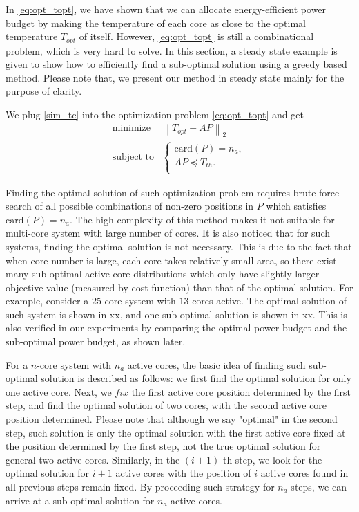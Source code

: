 In \eqref{eq:opt_topt}, we have shown that we can allocate energy-efficient power budget by making the temperature of each core as close to the optimal temperature $T_{opt}$ of itself. However, \eqref{eq:opt_topt} is still a combinational problem, which is very hard to solve. In this section, a steady state example is given to show how to efficiently find a sub-optimal solution using a greedy based method. Please note that, we present our method in steady state mainly for the purpose of clarity.

We plug \eqref{sim_tc} into the optimization problem \eqref{eq:opt_topt} and get
\begin{equation}\label{eq:sim_opt_topt}
\begin{split}
\text{minimize } &  \left \| T_{opt} - AP \right \|_{2}\\
\text{subject to} &\left\{
\begin{array}{lr}
\text{card}(P) = n_{a},\\
AP \preceq T_{th}.\\
\end{array}
\right.
\end{split}
\end{equation}

Finding the optimal solution of such optimization problem requires brute force search of all possible combinations of non-zero positions in $P$ which satisfies $\text{card}(P)=n_{a}$. The high complexity of this method makes it not suitable for multi-core system with large number of cores. It is also noticed that for such systems, finding the optimal solution is not necessary. This is due to the fact that when core number is large, each core takes relatively small area, so there exist many sub-optimal active core distributions which only have slightly larger objective value (measured by cost function) than that of the optimal solution. For example, consider a $25$-core system with $13$ cores active. The optimal solution of such system is shown in xx, and one sub-optimal solution is shown in xx. This is also verified in our experiments by comparing the optimal power budget and the sub-optimal power budget, as shown later.

For a $n$-core system with $n_{a}$ active cores, the basic idea of finding such sub-optimal solution is described as follows: we first find the optimal solution for only one active core. Next, we $fix$ the first active core position determined by the first step, and find the optimal solution of two cores, with the second active core position determined. Please note that although we say "optimal" in the second step, such solution is only the optimal solution with the first active core fixed at the position determined by the first step, not the true optimal solution for general two active cores. Similarly, in the $(i+1)$-th step, we look for the optimal solution for $i+1$ active cores with the position of $i$ active cores found in all previous steps remain fixed. By proceeding such strategy for $n_{a}$ steps, we can arrive at a sub-optimal solution for $n_{a}$ active cores.


